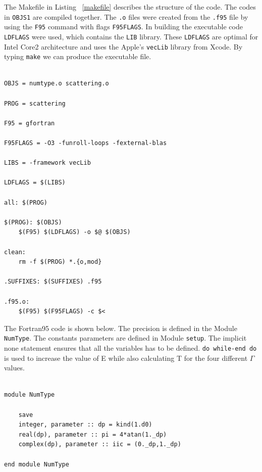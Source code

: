 \documentclass[12pt]{article}
\begin{document}
The Makefile in Listing \ \ref{makefile} describes the structure of the code. The codes in {\tt OBJS1} are 
compiled together. The {\tt .o} files were created from the {\tt .f95} file by using the {\tt F95} command
with flags {\tt F95FLAGS}. In building the executable code {\tt LDFLAGS} were used, which contains 
the {\tt LIB} library. These {\tt LDFLAGS} are optimal for Intel Core2 architecture and uses the 
Apple's {\tt vecLib} library from Xcode. By typing {\tt make} we can produce the executable file.





\begin{lstlisting}[frame=single,caption={Typical {\tt Makefile}},label=makefile]

OBJS = numtype.o scattering.o 

PROG = scattering

F95 = gfortran

F95FLAGS = -O3 -funroll-loops -fexternal-blas

LIBS = -framework vecLib

LDFLAGS = $(LIBS)

all: $(PROG) 

$(PROG): $(OBJS)
	$(F95) $(LDFLAGS) -o $@ $(OBJS) 

clean:
	rm -f $(PROG) *.{o,mod}

.SUFFIXES: $(SUFFIXES) .f95

.f95.o:
	$(F95) $(F95FLAGS) -c $<

\end{lstlisting}

The Fortran95 code is shown below. The precision is defined in the Module {\tt NumType}. The constants parameters are defined in Module {\tt setup}. The implicit none statement ensures that all the variables has to be defined. {\tt do while-end do} is used to increase the value of E while also calculating T for the four different $\Gamma$ values. 


\begin{lstlisting}[frame=single,caption={Module {\tt NumType}},label=module]

module NumType

	save
	integer, parameter :: dp = kind(1.d0)
	real(dp), parameter :: pi = 4*atan(1._dp)
	complex(dp), parameter :: iic = (0._dp,1._dp)
	
end module NumType

\end{lstlisting}
\end{document}
